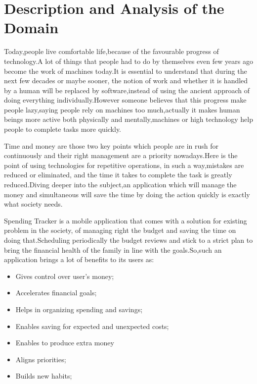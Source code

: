  \section{Description and Analysis of the Domain}
 Today,people live comfortable life,because of the favourable progress of technology.A lot of things that people had to do by themselves even few years ago become the work of machines today.It is essential to understand that during the next few decades or maybe sooner, the notion of work and whether it is handled by a human will be replaced by software,instead of using the ancient approach of doing everything individually.However someone believes that this progress make people lazy,saying people rely on machines too much,actually it makes human beings more active both physically and mentally,machines or high technology help people to complete tasks more quickly.
 
 Time and money are those two key points which people are in rush for continuously and their right management are a priority nowadays.Here is the point of using technologies for repetitive operations, in such a way,mistakes are reduced or eliminated, and the time it takes to complete the task is greatly reduced.Diving deeper into the subject,an application which will manage the money and simultaneous will save the time by doing the action quickly is exactly what society needs.
 
 Spending Tracker is a mobile application that comes with a solution for existing problem in the society, of managing right the budget and saving the time on doing that.Scheduling periodically the budget reviews and stick to a strict plan to bring the financial health of the family in line with the goals.So,such an application brings a lot of benefits to its users as:
 \begin{itemize}
 	\item Gives control over user's money;
 	\item Accelerates financial goals;
 	\item Helps in organizing spending and savings;
 	\item Enables saving for expected and unexpected costs;
 	\item Enables to produce extra money
 	\item Aligns priorities;
 	\item Builds new habits;
 \end{itemize}
 
